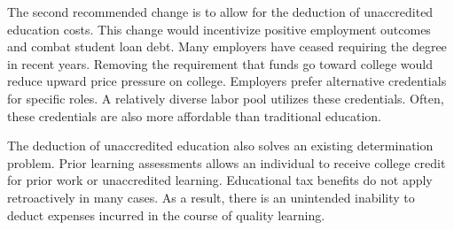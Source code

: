 \documentclass[review]{elsarticle}
\begin{document}


The second recommended change is to allow for the deduction of unaccredited education costs.
This change would incentivize positive employment outcomes and combat student loan debt.
Many employers have ceased requiring the degree in recent years.
Removing the requirement that funds go toward college would reduce upward price pressure on college.
Employers prefer alternative credentials for specific roles.
A relatively diverse labor pool utilizes these credentials.
Often, these credentials are also more affordable than traditional education.

The deduction of unaccredited education also solves an existing determination problem.
Prior learning assessments allows an individual to receive college credit for prior work or unaccredited learning.
Educational tax benefits do not apply retroactively in many cases.
As a result, there is an unintended inability to deduct expenses incurred in the course of quality learning.

\end{document}
